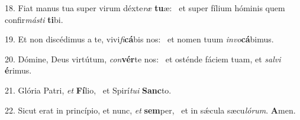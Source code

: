 18. Fiat manus tua super virum déxte\textit{ræ} \textbf{tu}æ: \ast\  et super fílium hóminis quem confir\textit{más}\textit{ti} \textbf{ti}bi.\

19. Et non discédimus a te, vivi\textit{fi}\textbf{cá}bis nos: \ast\  et nomen tuum \textit{in}\textit{vo}\textbf{cá}bimus.\

20. Dómine, Deus virtútum, \textit{con}\textbf{vér}te nos: \ast\  et osténde fáciem tuam, et \textit{sal}\textit{vi} \textbf{é}rimus.\

21. Glória Patri, \textit{et} \textbf{Fí}lio, \ast\  et Spirí\textit{tu}\textit{i} \textbf{Sanc}to.\

22. Sicut erat in princípio, et nunc, \textit{et} \textbf{sem}per, \ast\  et in sǽcula sæcu\textit{ló}\textit{rum}. \textbf{A}men.\

